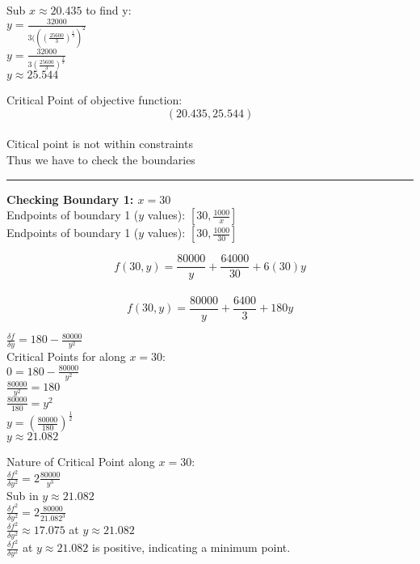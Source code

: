 \documentclass[11pt]{article}
\begin{document}
Sub \(x \approx 20.435\) to find y:\\
\(y = \frac {32000}{3(((\frac{25600}{3})^\frac{1}{3})^2}\)\\
\(y = \frac {32000}{3(\frac{25600}{3})^\frac{2}{3}}\)\\
\(y \approx 25.544\)

Critical Point of objective function:\\
\[(20.435,25.544)\]\\
Citical point is not within constraints\\
Thus we have to check the boundaries

    \begin{center}\rule{0.5\linewidth}{\linethickness}\end{center}

\textbf{Checking Boundary 1: \(x = 30\)}\\
Endpoints of boundary 1 (\(y\) values): \([30,\frac{1000}{x}]\)\\
Endpoints of boundary 1 (\(y\) values): \([30,\frac{1000}{30}]\)

\[f(30,y) = \frac {80000}{y} + \frac {64000}{30} + 6(30)y\]\\
\[f(30,y) = \frac {80000}{y} + \frac {6400}{3} + 180y\]

\(\frac{\delta f}{\delta y} = 180-\frac {80000}{y^2}\)\\
Critical Points for along \(x = 30\):\\
\(0 = 180-\frac {80000}{y^2}\)\\
\(\frac {80000}{y^2} = 180\)\\
\(\frac {80000}{180} = y^2\)\\
\(y = (\frac {80000}{180})^\frac {1}{2}\)\\
\(y \approx 21.082\)

Nature of Critical Point along \(x = 30\):\\
\(\frac{\delta f^2}{\delta y^2} = 2\frac {80000}{y^3}\)\\
Sub in \(y \approx 21.082\)\\
\(\frac{\delta f^2}{\delta y^2} = 2\frac {80000}{21.082^3}\)\\
\(\frac{\delta f^2}{\delta y^2} \approx 17.075\) at
\(y \approx 21.082\)\\
\(\frac{\delta f^2}{\delta y^2}\) at \(y \approx 21.082\) is positive,
indicating a minimum point.
\end{document}
